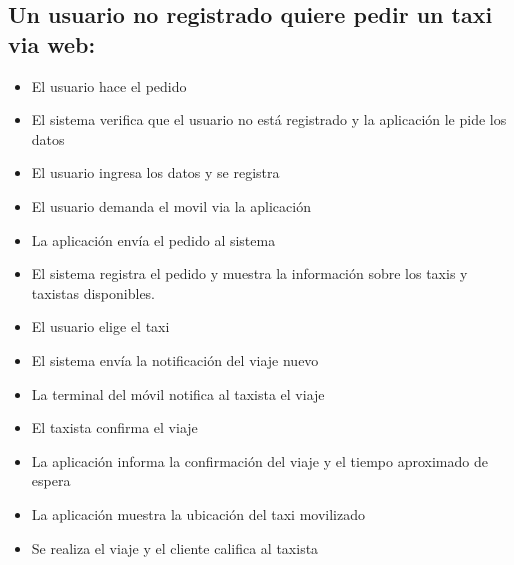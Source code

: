 \documentclass[a4paper]{artcle}
\begin{document}
\subsection{Un usuario no registrado quiere pedir un taxi via web:}
\begin{itemize}
\item El usuario hace el pedido
\item El sistema verifica que el usuario no est\'a registrado y la aplicaci\'on le pide los datos
\item El usuario ingresa los datos y se registra
\item El usuario demanda el movil via la aplicaci\'on
\item La aplicaci\'on env\'ia el pedido al sistema
\item El sistema registra el pedido y muestra la informaci\'on sobre los taxis y taxistas disponibles.
\item El usuario elige el taxi
\item El sistema env\'ia la notificaci\'on del viaje nuevo
\item La terminal del m\'ovil notifica al taxista el viaje
\item El taxista confirma el viaje
\item La aplicaci\'on informa la confirmaci\'on del viaje y el tiempo aproximado de espera
\item La aplicaci\'on muestra la ubicaci\'on del taxi movilizado
\item Se realiza el viaje y el cliente califica al taxista
\end{itemize}
\end{document}
